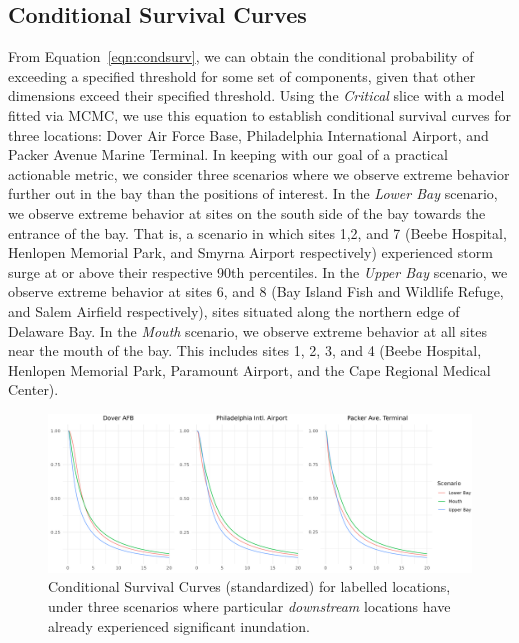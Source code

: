 \subsection{Conditional Survival Curves\label{sec:condsurv}}
From Equation~\ref{eqn:condsurv}, we can obtain the conditional probability of
    exceeding a specified threshold for some set of components, given that other 
    dimensions exceed their specified threshold. Using the \emph{Critical} slice with 
    a model fitted via MCMC, we use this equation to establish conditional survival 
    curves for three locations: Dover Air Force Base, Philadelphia International 
    Airport, and Packer Avenue Marine Terminal.  In keeping with our goal of a 
    practical actionable metric, we consider three scenarios where we observe extreme 
    behavior further out in the bay than the positions of interest.  In the 
    \emph{Lower Bay} scenario, we observe extreme behavior at sites on the south 
    side of the bay towards the entrance of the bay.  That is, a scenario in which 
    sites 1,2, and 7 (Beebe Hospital, Henlopen Memorial Park, and Smyrna Airport 
    respectively) experienced storm surge at or above their respective 90th 
    percentiles.  In the \emph{Upper Bay} scenario, we observe extreme behavior 
    at sites 6, and 8 (Bay Island Fish and Wildlife Refuge, and Salem Airfield 
    respectively), sites situated along the northern edge of Delaware Bay.  In 
    the \emph{Mouth} scenario, we observe extreme behavior at all sites near the 
    mouth of the bay.  This includes sites 1, 2, 3, and 4 (Beebe Hospital, Henlopen Memorial Park, 
    Paramount Airport, and the Cape Regional Medical Center). 

\begin{figure}[tb]
    \centering
    \includegraphics[width=0.95\linewidth]{./plots/condsurv/condsurv_1d_mcmc.png}
    \caption{Conditional Survival Curves (standardized) for labelled locations, under three 
        scenarios where particular \emph{downstream} locations have already experienced 
        significant inundation. \label{fig:condsurv1d}
        }
\end{figure}

